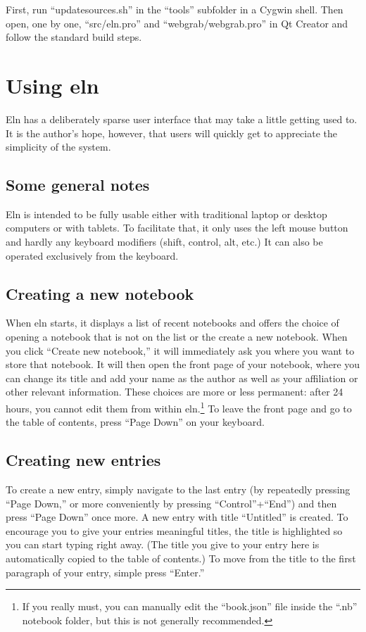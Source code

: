 \documentclass[11pt]{report}
\begin{document}
First, run ``updatesources.sh'' in the
``tools'' subfolder in a Cygwin shell. Then open, one by one, ``src/eln.pro''
and ``webgrab/webgrab.pro'' in Qt
Creator and follow the standard build steps.

\chapter{Using eln}

Eln has a deliberately sparse user interface that may take a little
getting used to. It is the author's hope, however, that users will
quickly get to appreciate the simplicity of the system.

\section{Some general notes}

Eln is intended to be fully usable either with traditional laptop or
desktop computers or with tablets. To facilitate that, it only uses
the left mouse button and hardly any keyboard modifiers (shift,
control, alt, etc.) It can also be operated exclusively from the
keyboard.

\section{Creating a new notebook}

When eln starts, it displays a list of recent notebooks and offers the
choice of opening a notebook that is not on the list or the create a
new notebook. When you click ``Create new notebook,'' it will
immediately ask you where you want to store that notebook. It will
then open the front page of your notebook, where you can change its
title and add your name as the author as well as your affiliation or
other relevant information. These choices are more or less permanent:
after 24 hours, you cannot edit them from within eln.\footnote{If you
  really must, you can manually edit the ``book.json'' file inside the
  ``.nb'' notebook folder, but this is not generally recommended.} To
leave the front page and go to the table of contents, press ``Page
Down'' on your keyboard.

\section{Creating new entries}

To create a new entry, simply navigate to the last entry (by
repeatedly pressing ``Page Down,'' or more conveniently by pressing
``Control''+``End'') and then press ``Page Down'' once more. A new
entry with title ``Untitled'' is created. To encourage you to give
your entries meaningful titles, the title is highlighted so you can
start typing right away. (The title you give to your entry here is
automatically copied to the table of contents.) To move from the title
to the first paragraph of your entry, simple press ``Enter.''
\end{document}
